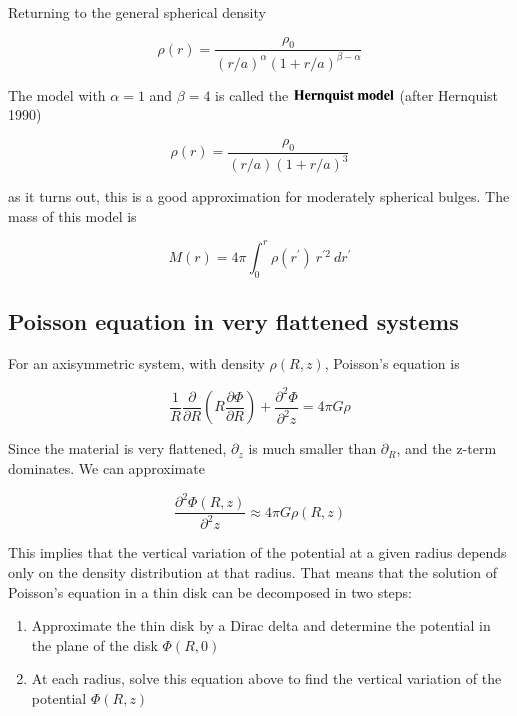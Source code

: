 Returning to the general spherical density 

\begin{equation}
\rho(r) = \frac{\rho_0}{(r/a)^\alpha (1+r/a)^{\beta-\alpha}}
\end{equation}


The model with $\alpha = 1$ and $\beta=4$ is called the ${\bf Hernquist \ model}$ (after Hernquist 1990)

\begin{equation}
\rho(r) = \frac{\rho_0}{(r/a) (1+r/a)^3}
\end{equation}

as it turns out, this is a good approximation for moderately spherical bulges. The mass of this model is 

\begin{equation}
M(r) =  4\pi \int_0^{r} \rho(r^\prime) \ r^{\prime 2} \ dr^\prime 
\end{equation}


\subsection{Poisson equation in very flattened systems}

For an axisymmetric system, with density $\rho(R,z)$, Poisson's equation is

\begin{equation}
\frac{1}{R}\frac{\partial}{\partial R} \left(R \frac{\partial\varPhi}{\partial R}\right) + \frac{\partial^2\varPhi}{\partial^2 z} = 4\pi G \rho
\end{equation}

Since the material is very flattened, $\partial_z$ is much smaller than $\partial_R$, and the z-term dominates. We can approximate


\begin{equation}
\frac{\partial^2\varPhi (R,z)}{\partial^2 z} \approx 4\pi G \rho(R,z)
\end{equation}

This implies that the vertical variation of the potential at a given radius depends only on the density distribution at that radius. That means that the solution of Poisson's equation in a thin disk can be decomposed in two steps: 

\begin{enumerate}
\item Approximate the thin disk by a Dirac delta and determine the potential in the plane of the disk $\varPhi(R,0)$
\item At each radius, solve this equation above to find the vertical variation of the potential $\varPhi(R,z)$ 
\end{enumerate}


